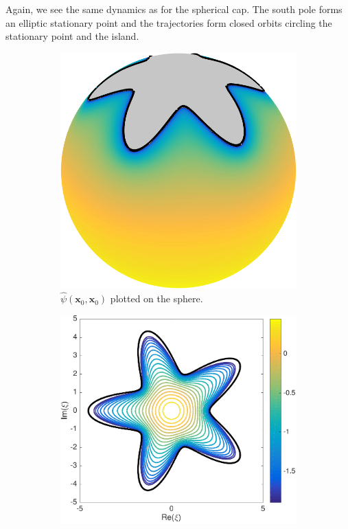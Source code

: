 \documentclass{sfuthesis}
\begin{document}
Again, we see the same dynamics as for the spherical cap. The south pole forms an elliptic stationary point and the trajectories form closed orbits circling the stationary point and the island. 
 \begin{figure}[h]
        \centering
        \begin{subfigure}[b]{0.35\textwidth}
        		\includegraphics[width=\textwidth]{Ex6-5StarPsiHat}
			\caption{\vspace{0.3cm}$\hat{\psi}(\mathbf{x}_0, \mathbf{x}_0)$ plotted on the sphere.}
     \end{subfigure} \hspace{1cm}
      \begin{subfigure}[b]{0.4\textwidth}
      			\includegraphics[width=\textwidth]{Ex6-5StarPsiHatStereo}

\end{subfigure}
\end{figure}
\end{document}
